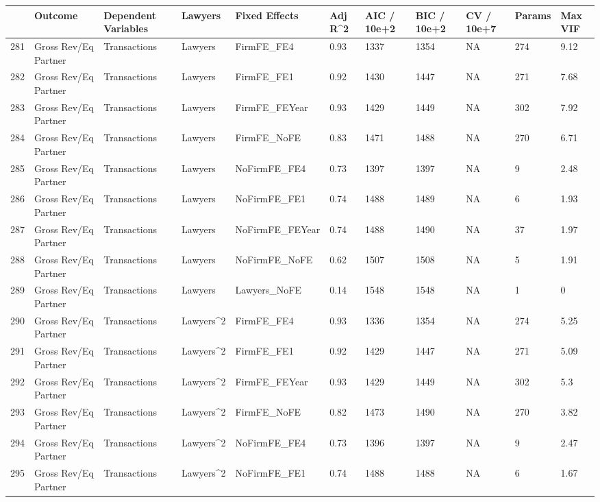 \documentclass{article}
\begin{document}
\begin{table}[H]
\centering
\begin{tabular}{rllllllllll}
  \hline
 & Outcome & Dependent Variables & Lawyers & Fixed Effects & Adj R^2 & AIC / 10e+2 & BIC / 10e+2 & CV / 10e+7 & Params & Max VIF \\ 
  \hline
281 & Gross Rev/Eq Partner & Transactions & Lawyers & FirmFE\_FE4 & 0.93 & 1337 & 1354 & NA & 274 & 9.12 \\ 
  282 & Gross Rev/Eq Partner & Transactions & Lawyers & FirmFE\_FE1 & 0.92 & 1430 & 1447 & NA & 271 & 7.68 \\ 
  283 & Gross Rev/Eq Partner & Transactions & Lawyers & FirmFE\_FEYear & 0.93 & 1429 & 1449 & NA & 302 & 7.92 \\ 
  284 & Gross Rev/Eq Partner & Transactions & Lawyers & FirmFE\_NoFE & 0.83 & 1471 & 1488 & NA & 270 & 6.71 \\ 
  285 & Gross Rev/Eq Partner & Transactions & Lawyers & NoFirmFE\_FE4 & 0.73 & 1397 & 1397 & NA & 9 & 2.48 \\ 
  286 & Gross Rev/Eq Partner & Transactions & Lawyers & NoFirmFE\_FE1 & 0.74 & 1488 & 1489 & NA & 6 & 1.93 \\ 
  287 & Gross Rev/Eq Partner & Transactions & Lawyers & NoFirmFE\_FEYear & 0.74 & 1488 & 1490 & NA & 37 & 1.97 \\ 
  288 & Gross Rev/Eq Partner & Transactions & Lawyers & NoFirmFE\_NoFE & 0.62 & 1507 & 1508 & NA & 5 & 1.91 \\ 
  289 & Gross Rev/Eq Partner & Transactions & Lawyers & Lawyers\_NoFE & 0.14 & 1548 & 1548 & NA & 1 & 0 \\ 
  290 & Gross Rev/Eq Partner & Transactions & Lawyers^2 & FirmFE\_FE4 & 0.93 & 1336 & 1354 & NA & 274 & 5.25 \\ 
  291 & Gross Rev/Eq Partner & Transactions & Lawyers^2 & FirmFE\_FE1 & 0.92 & 1429 & 1447 & NA & 271 & 5.09 \\ 
  292 & Gross Rev/Eq Partner & Transactions & Lawyers^2 & FirmFE\_FEYear & 0.93 & 1429 & 1449 & NA & 302 & 5.3 \\ 
  293 & Gross Rev/Eq Partner & Transactions & Lawyers^2 & FirmFE\_NoFE & 0.82 & 1473 & 1490 & NA & 270 & 3.82 \\ 
  294 & Gross Rev/Eq Partner & Transactions & Lawyers^2 & NoFirmFE\_FE4 & 0.73 & 1396 & 1397 & NA & 9 & 2.47 \\ 
  295 & Gross Rev/Eq Partner & Transactions & Lawyers^2 & NoFirmFE\_FE1 & 0.74 & 1488 & 1488 & NA & 6 & 1.67 \\ 

\end{tabular}
\end{table}
\end{document}
